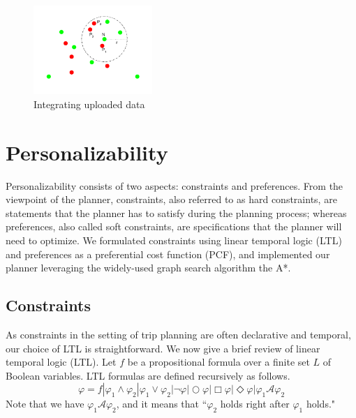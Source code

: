 \documentclass[letterpaper]{article}
\newcommand{\cA}{\mathcal{A}}
\begin{document}
\begin{figure}[!ht]
  \centering
    \includegraphics[width=0.4\textwidth]{figs/aux.pdf}
  \caption{Integrating uploaded data\label{fig:aux}}
\end{figure}


\section{Personalizability}
Personalizability consists of two aspects: constraints and preferences.
From the viewpoint of the planner,
constraints, also referred to as hard constraints, are statements that the planner
has to satisfy during the planning process; whereas preferences, also called
soft constraints, are specifications that the planner will need to optimize.
We formulated constraints using linear temporal logic (LTL) and preferences as
a preferential cost function (PCF), and implemented our planner leveraging the
widely-used graph search algorithm the A*.

\subsection{Constraints}
As constraints in the setting of trip planning are often declarative and
temporal, our choice of LTL is straightforward.
We now give a brief review of linear temporal logic (LTL).
Let $f$ be a propositional formula over a finite set $L$ of Boolean variables.  
LTL formulas are defined recursively as follows.
\begin{equation}
	\varphi = f | \varphi_1 \land \varphi_2 | \varphi_1 \lor \varphi_2 | \neg \varphi | 
		\bigcirc \varphi |	\Box \varphi | \Diamond \varphi | \varphi_1 \cA \varphi_2
\end{equation}
Note that we have $\varphi_1 \cA \varphi_2$, and it means that
``$\varphi_2$ holds right after $\varphi_1$ holds."
\end{document}
